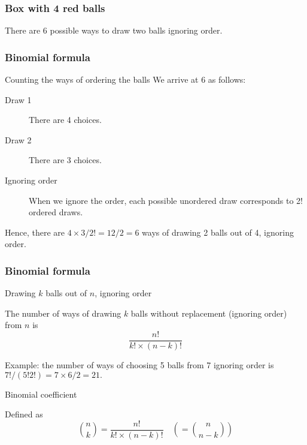 \documentclass[handout]{beamer}
\begin{document}
   \begin{frame}
   \frametitle{Box with 4 red balls}
   \begin{center}
   \end{center}
   There are 6 possible ways to draw two balls ignoring order.
   \end{frame}


   \begin{frame} \frametitle{Binomial formula}

   \begin{block}
   {Counting the ways of ordering the balls}
   We arrive at 6 as follows:
   \begin{description}

   \item[Draw 1] There are 4 choices.

   \item[Draw 2] There are 3 choices.

   \item[Ignoring order] When we ignore the order,
   each possible unordered draw corresponds to 2! ordered draws.
   \end{description}

   Hence, there are $4 \times 3 / 2! = 12 / 2 = 6$ ways
   of drawing 2 balls out of 4, ignoring order.
   \end{block}
   \end{frame}


   \begin{frame} \frametitle{Binomial formula}

   \begin{block}
   {Drawing $k$ balls out of $n$, ignoring order}

   The number of ways of drawing $k$ balls without replacement (ignoring order)
   from $n$ is
   $$
   \frac{n!}{k! \times (n-k)!}
   $$

   Example: the number of ways of choosing 5 balls from 7 ignoring order is
   $7! / (5! 2!) = 7 \times 6 /2  = 21.$
   \end{block}

   \begin{block}
   {Binomial coefficient}

   Defined as
   $$
   \binom{n}{k} = \frac{n!}{k! \times (n-k)!} \quad \left(= \binom{n}{n-k} \right)
   $$
   \end{block}
   \end{frame}
\end{document}
